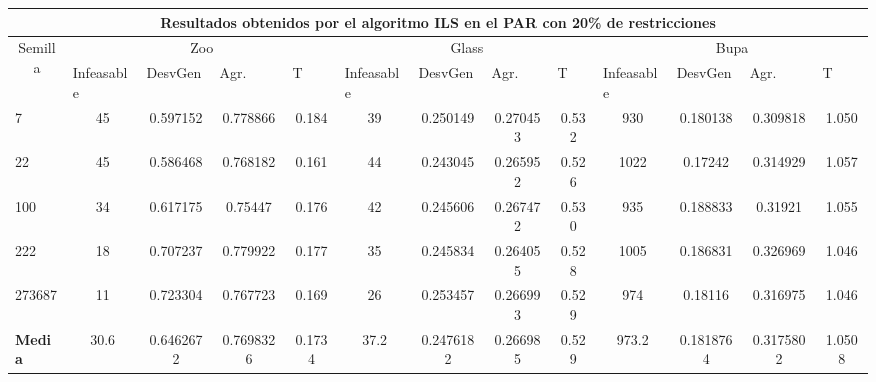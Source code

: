 \begin{table}[H]
	\tiny

	\begin{adjustwidth}{-1cm}{-1cm}%
	
	\begin{tabular}{|l|c|c|c|c|c|c|c|c|c|c|c|c|}
	\hline
	\multicolumn{13}{|c|}{\textbf{Resultados obtenidos por el algoritmo ILS en el PAR con 20\% de restricciones}}                                                                                                                                                                                                                                                                                                                                            \\ \hline
	\multicolumn{1}{|c|}{\multirow{2}{*}{Semilla}} & \multicolumn{4}{c|}{Zoo}                                                                                          & \multicolumn{4}{c|}{Glass}                                                                                         & \multicolumn{4}{c|}{Bupa}                                                                                          \\ \cline{2-13} 
	\multicolumn{1}{|c|}{}                                  & \multicolumn{1}{l|}{Infeasable} & \multicolumn{1}{l|}{DesvGen} & \multicolumn{1}{l|}{Agr.} & \multicolumn{1}{l|}{T} & \multicolumn{1}{l|}{Infeasable} & \multicolumn{1}{l|}{DesvGen} & \multicolumn{1}{l|}{Agr.} & \multicolumn{1}{l|}{T} & \multicolumn{1}{l|}{Infeasable} & \multicolumn{1}{l|}{DesvGen} & \multicolumn{1}{l|}{Agr.} & \multicolumn{1}{l|}{T} \\ \hline
	7   	& 45 & 0.597152 & 0.778866 & 0.184 &  				39 & 0.250149 & 0.270453 & 0.532 &			 	930 & 0.180138 & 0.309818 & 1.050 		\\ \hline
	22 		& 45 & 0.586468 & 0.768182 & 0.161 & 				44 & 0.243045 & 0.265952 & 0.526	&		 	1022 & 0.17242 & 0.314929 & 1.057		\\ \hline
	100 	& 34 & 0.617175 & 0.75447 & 0.176 & 				42 & 0.245606 & 0.267472 & 0.530 &				935 & 0.188833 & 0.31921 & 1.055		\\ \hline
	222 	& 18 & 0.707237 & 0.779922 & 0.177 &				35 & 0.245834 & 0.264055 & 0.528 &				1005 & 0.186831 & 0.326969 & 1.046		\\ \hline
	273687 	& 11 & 0.723304 & 0.767723 & 0.169 &				26 & 0.253457 & 0.266993 & 0.529 &				974 & 0.18116 & 0.316975 & 1.046		\\ \hline
	\textbf{Media} &  30.6	&0.6462672	&0.7698326&	0.1734&	37.2&	0.2476182&	0.266985	&0.529	&973.2	&0.1818764	&0.3175802	&1.0508   \\ \hline
	\end{tabular}
	
	\end{adjustwidth}
	
\end{table}

